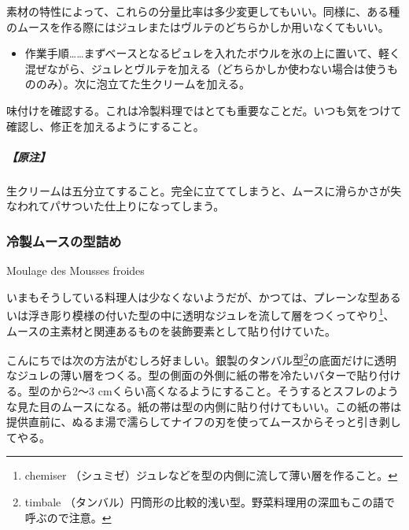 \begin{recette}
素材の特性によって、これらの分量比率は多少変更してもいい。同様に、ある種のムースを作る際にはジュレまたはヴルテのどちらかしか用いなくてもいい。

\begin{itemize}
\tightlist
\item
  作業手順\ldots{}\ldots{}まずベースとなるピュレを入れたボウルを氷の上に置いて、軽く混ぜながら、ジュレとヴルテを加える（どちらかしか使わない場合は使うもののみ）。次に泡立てた生クリームを加える。
\end{itemize}

味付けを確認する。これは冷製料理ではとても重要なことだ。いつも気をつけて確認し、修正を加えるようにすること。

\hypertarget{nota-composition-de-l-appareil-pour-mousses-et-mousseline-froides}{%
\subparagraph{【原注】}\label{nota-composition-de-l-appareil-pour-mousses-et-mousseline-froides}}

生クリームは五分立てすること。完全に立ててしまうと、ムースに滑らかさが失なわれてパサついた仕上りになってしまう。

\atoaki{}

\hypertarget{moulage-des-mousses-froides}{%
\subsubsection{冷製ムースの型詰め}\label{moulage-des-mousses-froides}}

\begin{frsubenv}

Moulage des Mousses froides

\end{frsubenv}


いまもそうしている料理人は少なくないようだが、かつては、プレーンな型あるいは浮き彫り模様の付いた型の中に透明なジュレを流して層をつくってやり\footnote{chemiser
  （シュミゼ）ジュレなどを型の内側に流して薄い層を作ること。}、ムースの主素材と関連あるものを装飾要素として貼り付けていた。

こんにちでは次の方法がむしろ好ましい。銀製のタンバル型\footnote{timbale
  （タンバル）円筒形の比較的浅い型。野菜料理用の深皿もこの語で呼ぶので注意。}の底面だけに透明なジュレの薄い層をつくる。型の側面の外側に紙の帯を冷たいバターで貼り付ける。型のから2〜3
cmくらい高くなるようにすること。そうするとスフレのような見た目のムースになる。紙の帯は型の内側に貼り付けてもいい。この紙の帯は提供直前に、ぬるま湯で濡らしてナイフの刃を使ってムースからそっと引き剥してやる。


\end{recette}
